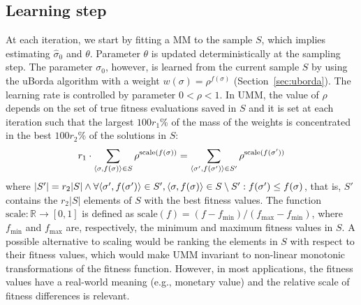 \documentclass[sigconf,dvipsnames]{acmart}
\begin{document}
\subsection{Learning step}
%
At each iteration, we start by fitting a MM to the sample $S$, which implies
estimating $\hat\sigma_0$ and $\theta$. Parameter $\theta$ is updated
deterministically at the sampling step.  The parameter $\sigma_0$, however, is
learned from the current sample $S$ by using the uBorda algorithm with a weight
$w(\sigma)=\rho^{f(\sigma)}$ (Section~\ref{sec:uborda}). The learning rate is
controlled by parameter $0 < \rho < 1$. 
In UMM, the value of $\rho$ depends on the set of true fitness evaluations saved in $S$
and it is set at each iteration such that the largest $100r_1$\% of the mass of
the weights is concentrated in the best $100r_2$\% of the solutions in $S$:
%
% 
\begin{equation}
    r_1 \cdot \sum_{\tuple{\sigma,f(\sigma)}\in S}\rho^{\text{scale}(f(\sigma))} =  \sum_{\tuple{\sigma', f(\sigma')}\in S'}\rho^{\text{scale}(f(\sigma'))}  %
\end{equation}
%
where $|S'| = r_2|S| \land \forall \langle \sigma',f(\sigma')\rangle\in S', \langle \sigma,f(\sigma)\rangle\in S\setminus S' : f(\sigma')\leq f(\sigma)$, that is, $S'$ contains the $r_2|S|$ elements of $S$ with the best fitness values. The function $\text{scale}\colon \mathbb{R} \to [0,1]$ is defined as $\text{scale}(f) = (f - f_\text{min})/(f_\text{max} - f_\text{min})$, where $f_\text{min}$ and $f_\text{max}$ are, respectively, the minimum and maximum fitness values in $S$. A possible alternative to scaling would be ranking the elements in $S$ with respect to their fitness values, which would make UMM invariant to non-linear monotonic transformations of the fitness function. However, in most applications, the fitness values have a real-world meaning (e.g., monetary value) and the relative scale of fitness differences is relevant.

\end{document}
